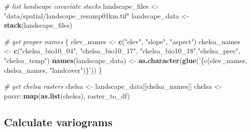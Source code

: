 \documentclass[]{article}
\newenvironment{Shaded}{}{}
\newcommand{\CommentTok}[1]{\textcolor[rgb]{0.38,0.63,0.69}{\textit{#1}}}
\newcommand{\ControlFlowTok}[1]{\textcolor[rgb]{0.00,0.44,0.13}{\textbf{#1}}}
\newcommand{\DataTypeTok}[1]{\textcolor[rgb]{0.56,0.13,0.00}{#1}}
\newcommand{\DecValTok}[1]{\textcolor[rgb]{0.25,0.63,0.44}{#1}}
\newcommand{\KeywordTok}[1]{\textcolor[rgb]{0.00,0.44,0.13}{\textbf{#1}}}
\newcommand{\NormalTok}[1]{#1}
\newcommand{\OperatorTok}[1]{\textcolor[rgb]{0.40,0.40,0.40}{#1}}
\newcommand{\StringTok}[1]{\textcolor[rgb]{0.25,0.44,0.63}{#1}}
\begin{document}
\begin{Shaded}
\begin{Highlighting}[]
\CommentTok{# list landscape covariate stacks}
\NormalTok{landscape_files <-}\StringTok{ "data/spatial/landscape_resamp01km.tif"}
\NormalTok{landscape_data <-}\StringTok{ }\KeywordTok{stack}\NormalTok{(landscape_files)}

\CommentTok{# get proper names}
\NormalTok{\{}
\NormalTok{  elev_names <-}\StringTok{ }\KeywordTok{c}\NormalTok{(}\StringTok{"elev"}\NormalTok{, }\StringTok{"slope"}\NormalTok{, }\StringTok{"aspect"}\NormalTok{)}
\NormalTok{  chelsa_names <-}\StringTok{ }\KeywordTok{c}\NormalTok{(}\StringTok{"chelsa_bio10_04"}\NormalTok{, }\StringTok{"chelsa_bio10_17"}\NormalTok{, }\StringTok{"chelsa_bio10_18"}\NormalTok{,}\StringTok{"chelsa_prec"}\NormalTok{, }\StringTok{"chelsa_temp"}\NormalTok{)}
  \KeywordTok{names}\NormalTok{(landscape_data) <-}\StringTok{ }\KeywordTok{as.character}\NormalTok{(}\KeywordTok{glue}\NormalTok{(}\StringTok{'\{c(elev_names, chelsa_names, "landcover")\}'}\NormalTok{))}
\NormalTok{\}}

\CommentTok{# get chelsa rasters}
\NormalTok{chelsa <-}\StringTok{ }\NormalTok{landscape_data[[chelsa_names]]}
\NormalTok{chelsa <-}\StringTok{ }\NormalTok{purrr}\OperatorTok{::}\KeywordTok{map}\NormalTok{(}\KeywordTok{as.list}\NormalTok{(chelsa), raster_to_df)}
\end{Highlighting}
\end{Shaded}

\hypertarget{calculate-variograms}{%
\subsection{Calculate variograms}\label{calculate-variograms}}

\begin{Shaded}
\end{Shaded}
\end{document}
